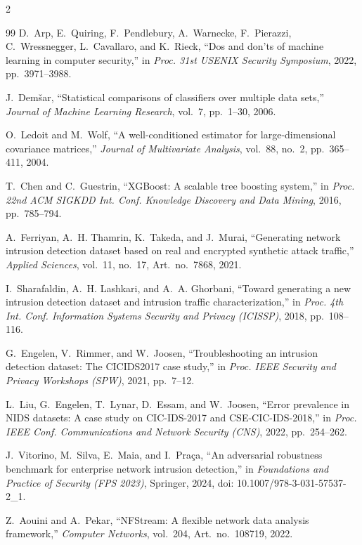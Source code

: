 \begin{multicols}{2}
\begin{thebibliography}{99}
D.~Arp, E.~Quiring, F.~Pendlebury, A.~Warnecke, F.~Pierazzi, C.~Wressnegger, L.~Cavallaro, and K.~Rieck, ``Dos and don'ts of machine learning in computer security,'' in \textit{Proc. 31st USENIX Security Symposium}, 2022, pp.~3971--3988.

J.~Dem\v{s}ar, ``Statistical comparisons of classifiers over multiple data sets,'' \textit{Journal of Machine Learning Research}, vol.~7, pp.~1--30, 2006.

O.~Ledoit and M.~Wolf, ``A well-conditioned estimator for large-dimensional covariance matrices,'' \textit{Journal of Multivariate Analysis}, vol.~88, no.~2, pp.~365--411, 2004.

T.~Chen and C.~Guestrin, ``XGBoost: A scalable tree boosting system,'' in \textit{Proc. 22nd ACM SIGKDD Int. Conf. Knowledge Discovery and Data Mining}, 2016, pp.~785--794.

A.~Ferriyan, A.~H. Thamrin, K.~Takeda, and J.~Murai, ``Generating network intrusion detection dataset based on real and encrypted synthetic attack traffic,'' \textit{Applied Sciences}, vol.~11, no.~17, Art.~no.~7868, 2021.

I.~Sharafaldin, A.~H. Lashkari, and A.~A. Ghorbani, ``Toward generating a new intrusion detection dataset and intrusion traffic characterization,'' in \textit{Proc. 4th Int. Conf. Information Systems Security and Privacy (ICISSP)}, 2018, pp.~108--116.

G.~Engelen, V.~Rimmer, and W.~Joosen, ``Troubleshooting an intrusion detection dataset: The CICIDS2017 case study,'' in \textit{Proc. IEEE Security and Privacy Workshops (SPW)}, 2021, pp.~7--12.

L.~Liu, G.~Engelen, T.~Lynar, D.~Essam, and W.~Joosen, ``Error prevalence in NIDS datasets: A case study on CIC-IDS-2017 and CSE-CIC-IDS-2018,'' in \textit{Proc. IEEE Conf. Communications and Network Security (CNS)}, 2022, pp.~254--262.

J.~Vitorino, M.~Silva, E.~Maia, and I.~Pra\c{c}a, ``An adversarial robustness benchmark for enterprise network intrusion detection,'' in \textit{Foundations and Practice of Security (FPS 2023)}, Springer, 2024, doi: 10.1007/978-3-031-57537-2\_1.

Z.~Aouini and A.~Pekar, ``NFStream: A flexible network data analysis framework,'' \textit{Computer Networks}, vol.~204, Art.~no.~108719, 2022.

\end{thebibliography}
\end{multicols}
